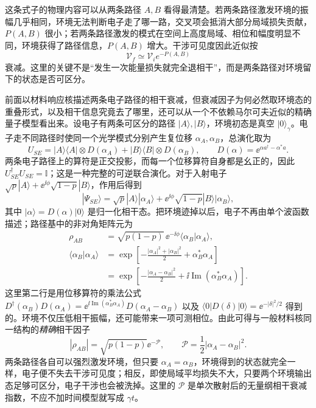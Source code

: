 这条式子的物理内容可以从两条路径 $A,B$ 看得最清楚。若两条路径激发环境的振幅几乎相同，环境无法判断电子走了哪一路，交叉项会抵消大部分局域损失贡献，$P(A,B)$ 很小；若两条路径激发的模式在空间上高度局域、相位和幅度明显不同，环境获得了路径信息，$P(A,B)$ 增大。干涉可见度因此近似按
\begin{equation}
\mathcal V_f\simeq \mathcal V_i e^{-P(A,B)}
\label{eq:ch05-visibility-material}
\end{equation}
衰减。这里的关键不是“发生一次能量损失就完全退相干”，而是两条路径对环境留下的状态是否可区分。

前面以材料响应核描述两条电子路径的相干衰减，但衰减因子为何必然取环境态的重叠形式，以及相干信息究竟去了哪里，还可以从一个不依赖马尔可夫近似的精确量子模型看出来。设电子有两条可区分的路径 $|A\rangle,|B\rangle$，环境初态是真空 $|0\rangle_\gamma$。电子走不同路径时使同一个光学模式分别产生复位移 $\alpha_A,\alpha_B$，总演化取为
\begin{equation}
U_{SE}=|A\rangle\langle A|\otimes D(\alpha_A)
+|B\rangle\langle B|\otimes D(\alpha_B),
\qquad D(\alpha)=\ee^{\alpha a^\dagger-\alpha^*a}.
\label{eq:env-controlled-displacement}
\end{equation}
两条电子路径上的算符是正交投影，而每一个位移算符自身都是幺正的，因此 $U_{SE}^\dagger U_{SE}=\mathbb I$；这是一种完整的可逆联合演化。对于入射电子 $\sqrt p|A\rangle+\ee^{\ii\phi}\sqrt{1-p}|B\rangle$，作用后得到
\[
|\Psi_{SE}\rangle=\sqrt p|A\rangle|\alpha_A\rangle
+\ee^{\ii\phi}\sqrt{1-p}|B\rangle|\alpha_B\rangle,
\]
其中 $|\alpha\rangle=D(\alpha)|0\rangle$ 是归一化相干态。把环境迹掉以后，电子不再由单个波函数描述；路径基中的非对角矩阵元为
\begin{align*}
\rho_{AB}
&=\sqrt{p(1-p)}\,\ee^{-\ii\phi}\langle\alpha_B|\alpha_A\rangle,\\
\langle\alpha_B|\alpha_A\rangle
&=\exp\!\left[-\frac{|\alpha_A|^2+|\alpha_B|^2}{2}
+\alpha_B^*\alpha_A\right]\\
&=\exp\!\left[-\frac{|\alpha_A-\alpha_B|^2}{2}
+\ii\operatorname{Im}(\alpha_B^*\alpha_A)\right].
\end{align*}
这里第二行是用位移算符的乘法公式
$D^\dagger(\alpha_B)D(\alpha_A)
=\ee^{\ii\operatorname{Im}(\alpha_B^*\alpha_A)}D(\alpha_A-\alpha_B)$
以及 $\langle0|D(\delta)|0\rangle=\ee^{-|\delta|^2/2}$ 得到的。环境不仅压低相干振幅，还可能带来一项可测相位。由此可得与一般材料核同一结构的\emph{精确}相干因子
\begin{equation}
|\rho_{AB}|=\sqrt{p(1-p)}\ee^{-\mathcal P},\qquad
\mathcal P=\frac12|\alpha_A-\alpha_B|^2.
\label{eq:env-overlap-decay}
\end{equation}
两条路径各自可以强烈激发环境，但只要 $\alpha_A=\alpha_B$，环境得到的状态就完全一样，电子便不失去干涉可见度；相反，即使局域平均损失不大，只要两个环境输出态足够可区分，电子干涉也会被洗掉。这里的 $\mathcal P$ 是单次散射后的无量纲相干衰减指数，不应不加时间模型就写成 $\gamma t$。

